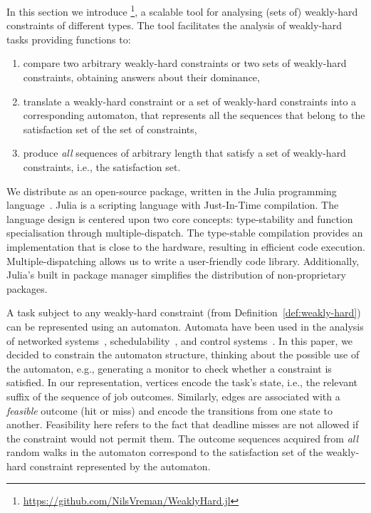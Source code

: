 In this section we introduce \tool{}\footnote{\url{https://github.com/NilsVreman/WeaklyHard.jl}}, a scalable tool for analysing (sets of) weakly-hard constraints of different types.
The tool facilitates the analysis of weakly-hard tasks providing functions to:
%
\begin{enumerate}[label=(\roman*)]
    \item compare two arbitrary weakly-hard constraints or two sets of weakly-hard constraints, obtaining answers about their dominance,%
    \item translate a weakly-hard constraint or a set of weakly-hard constraints into a corresponding automaton, that represents all the sequences that belong to the satisfaction set of the set of constraints,
    \item produce \emph{all} sequences of arbitrary length that satisfy a set of weakly-hard constraints, i.e., the satisfaction set.
\end{enumerate}
%
We distribute \tool{} as an open-source package, written in the Julia programming language~\cite{Julia:2017}.
Julia is a scripting language with Just-In-Time compilation.
The language design is centered upon two core concepts: type-stability and function specialisation through multiple-dispatch. 
The type-stable compilation provides an implementation that is close to the hardware, resulting in efficient code execution.
Multiple-dispatching allows us to write a user-friendly code library.
Additionally, Julia's built in package manager simplifies the distribution of non-proprietary packages.

A task subject to any weakly-hard constraint (from Definition~\ref{def:weakly-hard}) can be represented using an automaton.
Automata have been used in the analysis of networked systems~\cite{Huang:2019a, Osch:2001}, schedulability~\cite{Zeng:2012, Fersman:2002, Fersman:2007}, and control systems~\cite{Linsenmayer:2017, Linsenmayer:2021, Pazzaglia:2018, Horssen:2016}.
In this paper, we decided to constrain the automaton structure, thinking about the possible use of the automaton, e.g., generating a monitor to check whether a constraint is satisfied.
In our representation, vertices encode the task's state, i.e., the relevant suffix of the sequence of job outcomes.
Similarly, edges are associated with a \emph{feasible} outcome (hit or miss) and encode the transitions from one state to another.
Feasibility here refers to the fact that deadline misses are not allowed if the constraint would not permit them.
The outcome sequences acquired from \emph{all} random walks in the automaton correspond to the satisfaction set of the weakly-hard constraint represented by the automaton.

